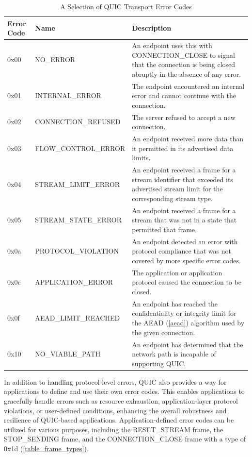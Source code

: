 \begin{table}[H]
\begin{center}
    \begin{tabular}{| l | l | p{75mm} |}
    \hline
    Error Code & Name & Description \\ \hline
    0x00 & NO\_ERROR & An endpoint uses this with CONNECTION\_CLOSE to signal that the connection is being closed abruptly in the absence of any error. \\ \hline
    0x01 & INTERNAL\_ERROR & The endpoint encountered an internal error and cannot continue with the connection. \\ \hline
    0x02 & CONNECTION\_REFUSED & The server refused to accept a new connection. \\ \hline
    0x03 & FLOW\_CONTROL\_ERROR & An endpoint received more data than it permitted in its
advertised data limits. \\ \hline
    0x04 & STREAM\_LIMIT\_ERROR & An endpoint received a frame for a stream identifier that exceeded its advertised stream limit for the corresponding stream type. \\ \hline
    0x05 & STREAM\_STATE\_ERROR & An endpoint received a frame for a stream that was not in a state that permitted that frame. \\ \hline
    0x0a & PROTOCOL\_VIOLATION & An endpoint detected an error with protocol compliance that was not covered by more specific error codes. \\ \hline
    0x0c & APPLICATION\_ERROR & The application or application protocol caused the connection to
be closed. \\ \hline
    0x0f & AEAD\_LIMIT\_REACHED & An endpoint has reached the confidentiality or integrity limit
for the AEAD (\ref{aead}) algorithm used by the given connection. \\ \hline
    0x10 & NO\_VIABLE\_PATH & An endpoint has determined that the network path is incapable of supporting QUIC. \\ \hline
    \end{tabular}
\end{center}
\caption{A Selection of QUIC Transport Error Codes \cite[121]{rfc9000}}
\label{tabelle_transport_error_codes}
\end{table}

In addition to handling protocol-level errors, QUIC also provides a way for applications to define and use their own error codes.
This enables applications to gracefully handle errors such as resource
exhaustion, application-layer protocol violations, or user-defined conditions, enhancing the overall robustness and resilience
of QUIC-based applications. Application-defined error codes can be utilized for various purposes, including the RESET\_STREAM
frame, the STOP\_SENDING frame, and the CONNECTION\_CLOSE frame with a type of 0x1d (\ref{table_frame_types}).

